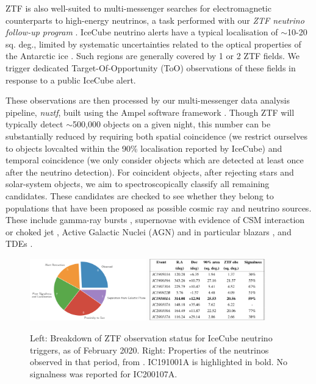 \documentclass[a4paper,11pt]{article}
\begin{document}
ZTF is also well-suited to multi-messenger searches for electromagnetic counterparts to high-energy neutrinos, a task performed with our \emph{ZTF neutrino follow-up program} \cite{bran}. IceCube neutrino alerts have a typical localisation of $\sim$10-20 sq. deg., limited by systematic uncertainties related to the optical properties of the Antarctic ice \cite{ic_resimulations_21}. Such regions are generally covered by 1 or 2 ZTF fields. We trigger dedicated Target-Of-Opportunity (ToO) observations of these fields in response to a public IceCube alert. 

These observations are then processed by our multi-messenger data analysis pipeline, \emph{nuztf}, built using the Ampel software framework \cite{ampel, nuztf}. Though ZTF will typically detect $\sim$500,000 objects on a given night, this number can be substantially reduced by requiring both spatial coincidence (we restrict ourselves to objects lovcalted within the 90\% localisation reported by IceCube) and temporal coincidence (we only consider objects which are detected at least once after the neutrino detection). For coincident objects, after rejecting stars and solar-system objects, we aim to spectroscopically classify all remaining candidates. These candidates are checked to see whether they belong to populations that have been proposed as possible cosmic ray and neutrino sources. These include gamma-ray bursts \cite{waxman_bahcall_97_grb}, supernovae with evidence of CSM interaction \cite{murase_csm_sn_11} or choked jet \cite{senno_choked_jets_16}, Active Galactic Nuclei (AGN) \cite{stecker_91} and in particular blazars \cite{mannheim_93}, and TDEs \cite{farrar_09, Biehl_tde_uhecr, hayasaki_19, winter_bran_21, winter_icrc_21, murase_tde_20, liu21_bran}.

\begin{figure}[!ht]
	\centering 
	\includegraphics[width=0.45\textwidth]{figures/ztf_pie}
	\includegraphics[width=0.45\textwidth]{figures/ztf_nu_table}
	\caption{Left: Breakdown of ZTF observation status for IceCube neutrino triggers, as of February 2020. Right: Properties of the neutrinos observed in that period, from \cite{bran}. IC191001A is highlighted in bold. No signalness was reported for IC200107A. }
	\label{fig:ztf_stats_bran}
\end{figure}
\end{document}
